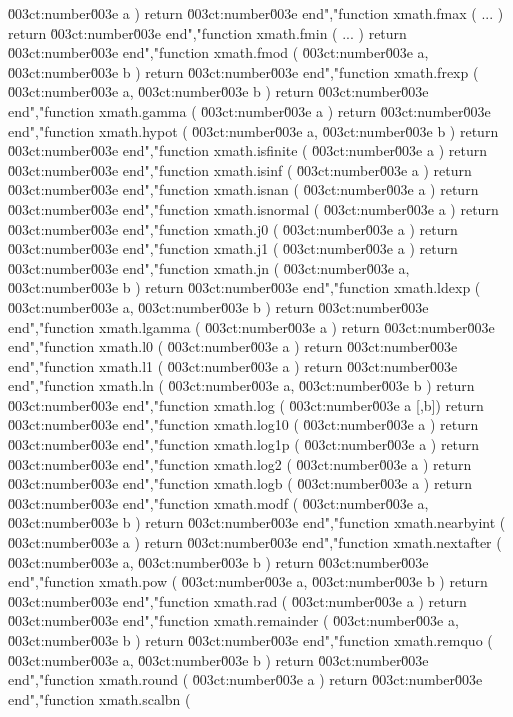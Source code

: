 \u003ct:number\u003e a )               return \u003ct:number\u003e end","function xmath.fmax       ( ... )                        return \u003ct:number\u003e end","function xmath.fmin       ( ... )                        return \u003ct:number\u003e end","function xmath.fmod       ( \u003ct:number\u003e a, \u003ct:number\u003e b ) return \u003ct:number\u003e end","function xmath.frexp      ( \u003ct:number\u003e a, \u003ct:number\u003e b ) return \u003ct:number\u003e end","function xmath.gamma      ( \u003ct:number\u003e a )               return \u003ct:number\u003e end","function xmath.hypot      ( \u003ct:number\u003e a, \u003ct:number\u003e b ) return \u003ct:number\u003e end","function xmath.isfinite   ( \u003ct:number\u003e a )               return \u003ct:number\u003e end","function xmath.isinf      ( \u003ct:number\u003e a )               return \u003ct:number\u003e end","function xmath.isnan      ( \u003ct:number\u003e a )               return \u003ct:number\u003e end","function xmath.isnormal   ( \u003ct:number\u003e a )               return \u003ct:number\u003e end","function xmath.j0         ( \u003ct:number\u003e a )               return \u003ct:number\u003e end","function xmath.j1         ( \u003ct:number\u003e a )               return \u003ct:number\u003e end","function xmath.jn         ( \u003ct:number\u003e a, \u003ct:number\u003e b ) return \u003ct:number\u003e end","function xmath.ldexp      ( \u003ct:number\u003e a, \u003ct:number\u003e b ) return \u003ct:number\u003e end","function xmath.lgamma     ( \u003ct:number\u003e a )               return \u003ct:number\u003e end","function xmath.l0         ( \u003ct:number\u003e a )               return \u003ct:number\u003e end","function xmath.l1         ( \u003ct:number\u003e a )               return \u003ct:number\u003e end","function xmath.ln         ( \u003ct:number\u003e a, \u003ct:number\u003e b ) return \u003ct:number\u003e end","function xmath.log        ( \u003ct:number\u003e a [,b])           return \u003ct:number\u003e end","function xmath.log10      ( \u003ct:number\u003e a )               return \u003ct:number\u003e end","function xmath.log1p      ( \u003ct:number\u003e a )               return \u003ct:number\u003e end","function xmath.log2       ( \u003ct:number\u003e a )               return \u003ct:number\u003e end","function xmath.logb       ( \u003ct:number\u003e a )               return \u003ct:number\u003e end","function xmath.modf       ( \u003ct:number\u003e a, \u003ct:number\u003e b ) return \u003ct:number\u003e end","function xmath.nearbyint  ( \u003ct:number\u003e a )               return \u003ct:number\u003e end","function xmath.nextafter  ( \u003ct:number\u003e a, \u003ct:number\u003e b ) return \u003ct:number\u003e end","function xmath.pow        ( \u003ct:number\u003e a, \u003ct:number\u003e b ) return \u003ct:number\u003e end","function xmath.rad        ( \u003ct:number\u003e a )               return \u003ct:number\u003e end","function xmath.remainder  ( \u003ct:number\u003e a, \u003ct:number\u003e b ) return \u003ct:number\u003e end","function xmath.remquo     ( \u003ct:number\u003e a, \u003ct:number\u003e b ) return \u003ct:number\u003e end","function xmath.round      ( \u003ct:number\u003e a )               return \u003ct:number\u003e end","function xmath.scalbn     ( 